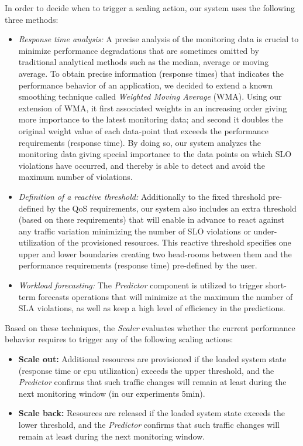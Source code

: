 In order to decide when to trigger a scaling action, our system uses the following three methods: 
\begin{itemize}

\item \emph{Response time analysis:} A precise analysis of the monitoring data is crucial to minimize performance degradations that are sometimes omitted by traditional analytical methods such as the median, average or moving average. To obtain precise information (response times) that indicates the performance behavior of an application, we decided to extend a known smoothing technique called \emph{Weighted Moving Average} (WMA). Using our extension of WMA, it first associated weights in an increasing order giving more importance to the latest monitoring data; and second it doubles the original weight value of each data-point that exceeds the performance requirements (response time). By doing so, our system analyzes the monitoring data giving special importance to the data points on which SLO violations have occurred, and thereby is able to detect and avoid the maximum number of violations.

\item \emph{Definition of a reactive threshold:} Additionally to the fixed threshold pre-defined by the QoS requirements, our system also includes an extra threshold (based on these requirements) that will enable in advance to react against any traffic variation minimizing the number of SLO violations or under-utilization of the provisioned resources. This reactive threshold specifies one upper and lower boundaries creating two head-rooms between them and the performance requirements (response time) pre-defined by the user.

\item \emph{Workload forecasting: }  The \emph{Predictor} component is utilized to trigger short-term forecasts operations that will minimize at the maximum the number of SLA violations, as well as keep a high level of efficiency in the predictions. 
\end{itemize}

Based on these techniques, the \emph{Scaler} evaluates whether the current performance behavior requires to trigger any of the following scaling actions:

\begin{itemize}

\item \textbf{Scale out:} Additional resources are provisioned if the loaded system state (response time or cpu utilization) exceeds the upper threshold, and the \emph{Predictor} confirms that such traffic changes will remain at least during the next monitoring window (in our experiments 5min). 

\item \textbf{Scale back:} Resources are released if the loaded system state exceeds the lower threshold, and the \emph{Predictor} confirms that such traffic changes will remain at least during the next monitoring window.

\end{itemize}



